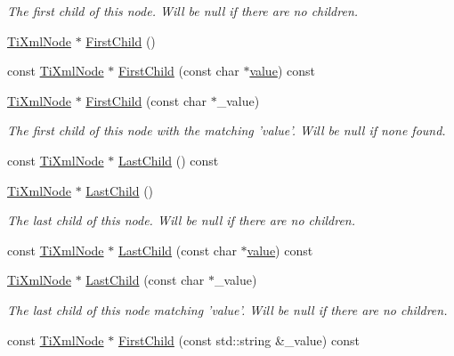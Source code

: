 \begin{DoxyCompactItemize}
\begin{DoxyCompactList}\small\item\em The first child of this node. Will be null if there are no children. \end{DoxyCompactList}\item 
\hyperlink{class_ti_xml_node}{Ti\-Xml\-Node} $\ast$ \hyperlink{class_ti_xml_node_a5e97d69b7c0ebd27fb7286be56559b77}{First\-Child} ()
\item 
const \hyperlink{class_ti_xml_node}{Ti\-Xml\-Node} $\ast$ \hyperlink{class_ti_xml_node_ab5f722624113c8203227de4f56576d31}{First\-Child} (const char $\ast$\hyperlink{class_ti_xml_node_aead528b3cedc33c16a6c539872c7cc8b}{value}) const 
\item 
\hyperlink{class_ti_xml_node}{Ti\-Xml\-Node} $\ast$ \hyperlink{class_ti_xml_node_abc8bf32be6419ec453a731868de19554}{First\-Child} (const char $\ast$\-\_\-value)
\begin{DoxyCompactList}\small\item\em The first child of this node with the matching 'value'. Will be null if none found. \end{DoxyCompactList}\item 
const \hyperlink{class_ti_xml_node}{Ti\-Xml\-Node} $\ast$ \hyperlink{class_ti_xml_node_a6d671107e00cca1d28cb2d7f3a87a21e}{Last\-Child} () const 
\item 
\hyperlink{class_ti_xml_node}{Ti\-Xml\-Node} $\ast$ \hyperlink{class_ti_xml_node_a6432d2b2495f6caf9cb4278df706a031}{Last\-Child} ()
\begin{DoxyCompactList}\small\item\em The last child of this node. Will be null if there are no children. \end{DoxyCompactList}\item 
const \hyperlink{class_ti_xml_node}{Ti\-Xml\-Node} $\ast$ \hyperlink{class_ti_xml_node_acdd3fdc436aa7433023310a041e5e63f}{Last\-Child} (const char $\ast$\hyperlink{class_ti_xml_node_aead528b3cedc33c16a6c539872c7cc8b}{value}) const 
\item 
\hyperlink{class_ti_xml_node}{Ti\-Xml\-Node} $\ast$ \hyperlink{class_ti_xml_node_abad5bf1059c48127b958711ef89e8e5d}{Last\-Child} (const char $\ast$\-\_\-value)
\begin{DoxyCompactList}\small\item\em The last child of this node matching 'value'. Will be null if there are no children. \end{DoxyCompactList}\item 
const \hyperlink{class_ti_xml_node}{Ti\-Xml\-Node} $\ast$ \hyperlink{class_ti_xml_node_a07f6200a5956c723c5b52d70f29c46f6}{First\-Child} (const std\-::string \&\-\_\-value) const 

\end{DoxyCompactItemize}
